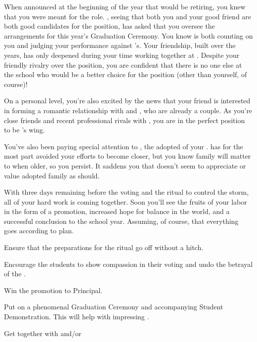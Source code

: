 \documentclass[char]{GL2020}
\begin{document}
When \cPrincipal{} announced at the beginning of the year that \cPrincipal{\they} would be retiring, you knew that you were meant for the role. \cPrincipal{}, seeing that both you and your good friend \cBeetle{} are both good candidates for the position, has asked that you oversee the arrangements for this year’s Graduation Ceremony.  You know \cPrincipal{} is both counting on you and judging your performance against \cBeetle{}’s.  Your friendship, built over the years, has only deepened during your time working together at \pSchool{}.  Despite your friendly rivalry over the position, you are confident that there is no one else at the school who would be a better choice for the position (other than yourself, of course)!

On a personal level, you’re also excited by the news that your friend \cInterpol{} is interested in forming a romantic relationship with \cBeetle{} and \cJuniorStatesman{}, who are already a couple.  As you’re close friends and recent professional rivals with \cBeetle{}, you are in the perfect position to be \cInterpol{}’s wing\cMusic{\person}.  

You’ve also been paying special attention to \cAdopted{}, the adopted \cAdopted{\child} of your \cAdoptedParentOne{\nibling}. \cAdopted{} has for the most part avoided your efforts to become closer, but you know family will matter to \cAdopted{\them} when \cAdopted{\theyare} older, so you persist. It saddens you that \cAdopted{} doesn’t seem to appreciate or value \cAdopted{\their} adopted family as \cAdopted{\they} should.

With three days remaining before the voting and the ritual to control the storm, all of your hard work is coming together.  Soon you’ll see the fruits of your labor in the form of a promotion, increased hope for balance in the world, and a successful conclusion to the school year. Assuming, of course, that everything goes according to plan.

\begin{itemz}[Goals]
	\item Ensure that the preparations for the ritual go off without a hitch.
	\item Encourage the students to show compassion in their voting and undo the betrayal of the \pShip{}.
	\item Win the promotion to Principal.
\item Put on a phenomenal Graduation Ceremony and accompanying Student Demonstration. This will help with impressing \cPrincipal{}.
\item Get \cInterpol{} together with \cBeetle{} and/or \cJuniorStatesman{}
\end{itemz}
\end{document}
